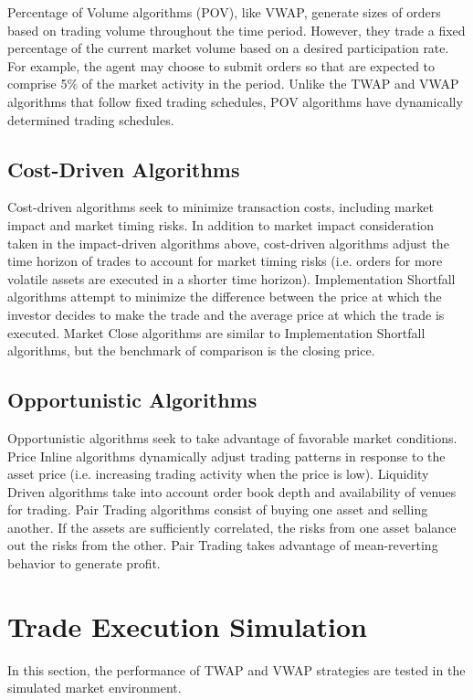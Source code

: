 Percentage of Volume algorithms (POV), like VWAP, generate sizes of orders based on trading volume throughout the time period. However, they trade a fixed percentage of the current market volume based on a desired participation rate. For example, the agent may choose to submit orders so that are expected to comprise 5\% of the market activity in the period. Unlike the TWAP and VWAP algorithms that follow fixed trading schedules, POV algorithms have dynamically determined trading schedules.

\subsection{Cost-Driven Algorithms}
Cost-driven algorithms seek to minimize transaction costs, including market impact and market timing risks. In addition to market impact consideration taken in the impact-driven algorithms above, cost-driven algorithms adjust the time horizon of trades to account for market timing risks (i.e. orders for more volatile assets are executed in a shorter time horizon). Implementation Shortfall algorithms attempt to minimize the difference between the price at which the investor decides to make the trade and the average price at which the trade is executed. Market Close algorithms are similar to Implementation Shortfall algorithms, but the benchmark of comparison is the closing price.

\subsection{Opportunistic Algorithms}
Opportunistic algorithms seek to take advantage of favorable market conditions. Price Inline algorithms dynamically adjust trading patterns in response to the asset price (i.e. increasing trading activity when the price is low). Liquidity Driven algorithms take into account order book depth and availability of venues for trading. Pair Trading algorithms consist of buying one asset and selling another. If the assets are sufficiently correlated, the risks from one asset balance out the risks from the other. Pair Trading takes advantage of mean-reverting behavior to generate profit.


\section{Trade Execution Simulation} \label{ch:sim_results}
In this section, the performance of TWAP and VWAP strategies are tested in the simulated market environment.
